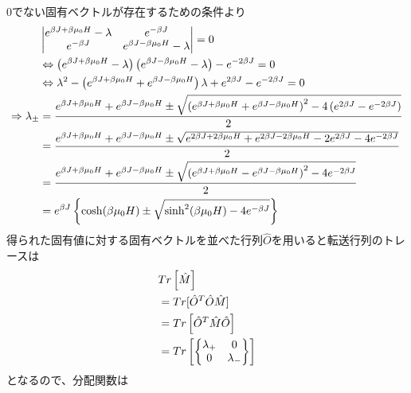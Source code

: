 \documentclass{jsarticle}  %
\numberwithin{equation}{section} %
\numberwithin{figure}{section}
\begin{document}
    0でない固有ベクトルが存在するための条件より
    \begin{align}
        &\left|
        \begin{matrix}
            e^{\beta J + \beta \mu_0 H} - \lambda & e^{-\beta J} \\
            e^{-\beta J}&e^{\beta J - \beta \mu_0 H} - \lambda 
        \end{matrix}
        \right| = 0 \notag \\
        &\Leftrightarrow \left( e^{\beta J + \beta \mu_0 H} - \lambda \right) \left( e^{\beta J - \beta \mu_0 H} - \lambda \right) - e^{-2\beta J} = 0 \notag \\
        &\Leftrightarrow \lambda^2 - \left( e^{\beta J + \beta \mu_0 H} + e^{\beta J - \beta \mu_0 H} \right) \lambda + e^{2\beta J} - e^{-2\beta J} = 0 \notag \\
        \Rightarrow \lambda_{\pm} &= \frac{e^{\beta J + \beta \mu_0 H} + e^{\beta J - \beta \mu_0 H} \pm \sqrt{\left( e^{\beta J + \beta \mu_0 H} + e^{\beta J - \beta \mu_0 H} \right)^2 -4\left( e^{2\beta J} - e^{-2\beta J} \right)}}{2} \notag \\
        &= \frac{e^{\beta J + \beta \mu_0 H} + e^{\beta J - \beta \mu_0 H} \pm \sqrt{ e^{2\beta J + 2\beta \mu_0 H} + e^{2\beta J - 2\beta \mu_0 H}  -2 e^{2\beta J} - 4e^{-2\beta J} }}{2} \notag \\
        &= \frac{e^{\beta J + \beta \mu_0 H} + e^{\beta J - \beta \mu_0 H} \pm \sqrt{ \left( e^{\beta J + \beta \mu_0 H} - e^{\beta J - \beta \mu_0 H} \right)^2 - 4e^{-2\beta J} }}{2} \notag \\
        &= e^{\beta J} \left\{ \cosh(\beta \mu_0 H) \pm \sqrt{\sinh^2(\beta \mu_0 H) - 4e^{-\beta J}} \right\}
    \end{align}
    得られた固有値に対する固有ベクトルを並べた行列$\hat{O}$を用いると転送行列のトレースは
    \begin{align}
        &Tr\left[ \hat{M} \right] \notag \\
        &= Tr[\hat{O}^T \hat{O} \hat{M}] \notag \\
        &= Tr \left[ \hat{O}^T \hat{M} \hat{O} \right] \notag \\
        &= Tr \left[ \left\{
        \begin{matrix}
            \lambda_+ &0\\
            0&\lambda_-
        \end{matrix} 
        \right\} \right]
    \end{align}
    となるので、分配関数は
\end{document}
